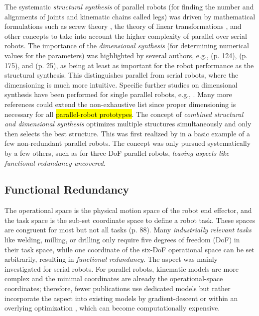 The systematic \emph{structural synthesis} of parallel robots (for finding the number and alignments of joints and kinematic chains called legs) was driven by mathematical formulations such as screw theory \cite{KongGos2007}, the theory of linear transformations \cite{Gogu2008}, and other concepts to take into account the higher complexity of parallel over serial robots.
The importance of the \emph{dimensional synthesis} (for determining numerical values for the parameters) was highlighted by several authors, e.g., \cite{Frindt2001} (p. 124), \cite{Krefft2006} (p. 175), and \cite{Merlet2006} (p. 25), as being at least as important for the robot performance as the structural synthesis. This distinguishes parallel from serial robots, where the dimensioning is much more intuitive. Specific further studies on dimensional synthesis have been performed for single parallel robots, e.g., \cite{Kirchner2000,StockMil2003,RaoRaoSah2005,Krefft2006,CarboneOttCec2007,KelaiaiaComZaa2012,Miller2004,LaribiRomZeg2007,LiuHuaMeiZha2012,Daake2012,JamwalHusXie2015}.
Many more references could extend the non-exhaustive list since proper dimensioning is necessary for all \hl{parallel-robot prototypes}. %
The concept of \emph{combined structural and dimensional synthesis} optimizes multiple structures simultaneously and only then selects the best structure. 
This was first realized by \cite{Krefft2006,Kirchner2000} in a basic example of a few non-redundant parallel robots. The concept was only pursued systematically by a few others, such as \cite{Prause2016} for three-DoF parallel robots, \emph{leaving aspects like functional redundancy uncovered}.

%


%

\subsection{Functional Redundancy}
\label{sec:previouswork_taskred}
%

%
%
The operational space is the physical motion space of the robot end effector, and the task space is the sub-set coordinate space to define a robot task. 
These spaces are congruent for most but not all tasks \cite{SciaviccoSicVilOri2009} (p. 88).
Many \emph{industrially relevant tasks} %
like welding, milling, or drilling only require five degrees of freedom (DoF) in their task space, while one coordinate of the six-DoF operational space can be set arbitrarily, resulting in \emph{functional redundancy}.
%
The aspect was mainly investigated for serial robots. %
For parallel robots, kinematic models are more complex and the minimal coordinates are already the operational-space coordinates; therefore, fewer publications use dedicated models \cite{SchapplerTapOrt2019c} but rather incorporate the aspect into existing models by gradient-descent \cite{AgarwalNasBan2016} or within an overlying optimization \cite{MerletPerDan2000,OenWan2007,CorinaldiAngCal2016,SantosSil2017,GaoCheGaoXia2019,Schappler2023_ICINCOLNEE}, which can become computationally expensive.

